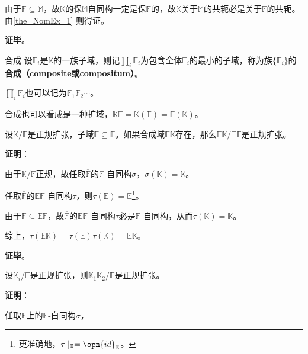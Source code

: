 
由于$\mathbb{F}\subseteq\mathbb{M}$，故$\mathbb{K}$的保$\mathbb{M}$自同构一定是保$\mathbb{F}$的，故$\mathbb{K}$关于$\mathbb{M}$的共轭必是关于$\mathbb{F}$的共轭。由\autoref{the_NomEx_1} 则得证。

\textbf{证毕}。





\begin{definition}{合成}
设$\mathbb{F}_i$是$\mathbb{K}$的一族子域，则记$\prod_{i}\mathbb{F}_i$为包含全体$\mathbb{F}_i$的最小的子域，称为族$\{\mathbb{F}_i\}$的\textbf{合成（composite或compositum）}。

$\prod_{i}\mathbb{F}_i$也可以记为$\mathbb{F}_1\mathbb{F}_2\cdots$。
\end{definition}


合成也可以看成是一种扩域，$\mathbb{K}\mathbb{F}=\mathbb{K}(\mathbb{F})=\mathbb{F}(\mathbb{K})$。


\begin{theorem}{}\label{the_NomEx_7}
设$\mathbb{K}/\mathbb{F}$是正规扩张，子域$\mathbb{E}\subseteq\overline{\mathbb{F}}$。如果合成域$\mathbb{EK}$存在，那么$\mathbb{EK}/\mathbb{EF}$是正规扩张。
\end{theorem}

\textbf{证明}：


由于$\mathbb{K}/\mathbb{F}$正规，故任取$\overline{\mathbb{F}}$的$\mathbb{F}$-自同构$\sigma$，$\sigma(\mathbb{K})=\mathbb{K}$。

任取$\overline{\mathbb{F}}$的$\mathbb{EF}$-自同构$\tau$，则$\tau(\mathbb{E})=\mathbb{E}$\footnote{更准确地，$\tau\mid_{\mathbb{E}}=\opn{id}_\mathbb{E}$。}。

由于$\mathbb{F}\subseteq\mathbb{EF}$，故$\overline{\mathbb{F}}$的$\mathbb{EF}$-自同构$\tau$必是$\mathbb{F}$-自同构，从而$\tau(\mathbb{K})=\mathbb{K}$。

综上，$\tau(\mathbb{EK})=\tau(\mathbb{E})\tau(\mathbb{K})=\mathbb{EK}$。

\textbf{证毕}。






\begin{theorem}{}
设$\mathbb{K}_i/\mathbb{F}$是正规扩张，则$\mathbb{K}_1\mathbb{K}_2/\mathbb{F}$是正规扩张。
\end{theorem}


\textbf{证明}：

任取$\overline{\mathbb{F}}$上的$\mathbb{F}$-自同构$\sigma$，

